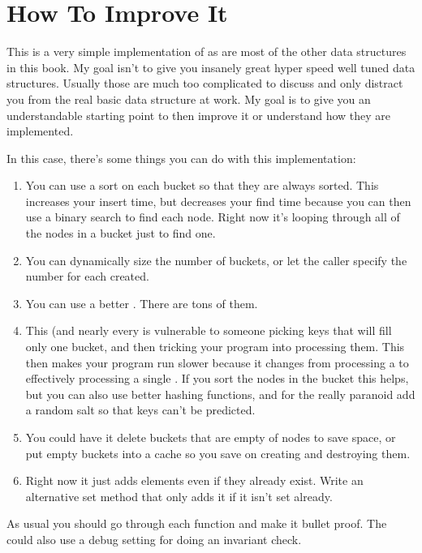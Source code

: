 \section{How To Improve It}

This is a very simple implementation of  as are most of
the other data structures in this book.  My goal isn't to give you
insanely great hyper speed well tuned data structures.  Usually those
are much too complicated to discuss and only distract you from the real
basic data structure at work.  My goal is to give you an understandable
starting point to then improve it or understand how they are implemented.

In this case, there's some things you can do with this implementation:

\begin{enumerate}
\item You can use a sort on each bucket so that they are always sorted.
    This increases your insert time, but decreases your find time because
    you can then use a binary search to find each node.  Right now
    it's looping through all of the nodes in a bucket just to find one.
\item You can dynamically size the number of buckets, or let the caller
    specify the number for each  created.
\item You can use a better .  There are tons of them.
\item This (and nearly every  is vulnerable to someone picking
    keys that will fill only one bucket, and then tricking your program
    into processing them.  This then makes your program run slower because
    it changes from processing a  to effectively processing
    a single .  If you sort the nodes in the bucket this
    helps, but you can also use better hashing functions, and for 
    the really paranoid add a random salt so that keys can't be predicted.
\item You could have it delete buckets that are empty of nodes to save space,
    or put empty buckets into a cache so you save on creating and destroying
    them.
\item Right now it just adds elements even if they already exist.  Write an
    alternative set method that only adds it if it isn't set already.
\end{enumerate}

As usual you should go through each function and make it bullet proof.  The 
 could also use a debug setting for doing an invariant check.


